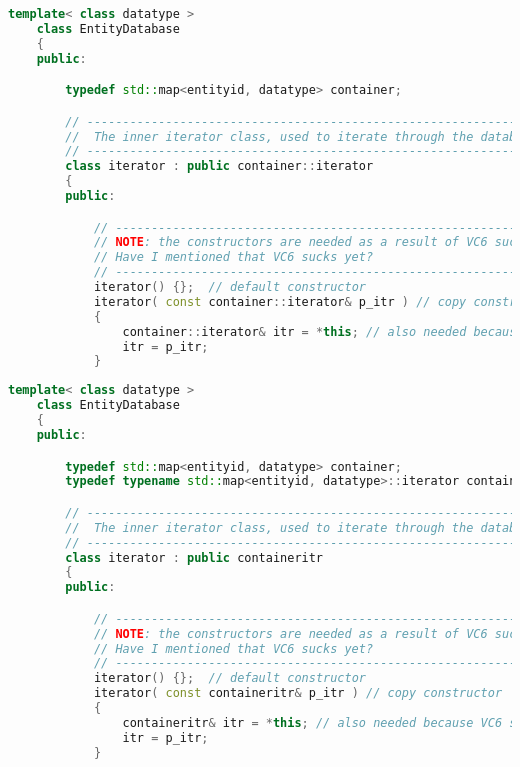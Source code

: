 \begin{lstlisting}[breaklines, label={lst:containeritrOri}, caption={Acesso ao iterador do tipo 'container' antes da correção}, language=C++]
    template< class datatype >
    class EntityDatabase
    {
    public:

        typedef std::map<entityid, datatype> container;

        // --------------------------------------------------------------------
        //  The inner iterator class, used to iterate through the database.
        // --------------------------------------------------------------------
        class iterator : public container::iterator
        {
        public:

            // --------------------------------------------------------------------
            // NOTE: the constructors are needed as a result of VC6 sucking.
            // Have I mentioned that VC6 sucks yet?
            // --------------------------------------------------------------------
            iterator() {};  // default constructor
            iterator( const container::iterator& p_itr ) // copy constructor
            {
                container::iterator& itr = *this; // also needed because VC6 sucks
                itr = p_itr;
            }
\end{lstlisting}

\begin{lstlisting}[breaklines, label={lst:containeritrFix}, caption={Correção do acesso ao iterador do tipo 'container'}, language=C++]
    template< class datatype >
    class EntityDatabase
    {
    public:

        typedef std::map<entityid, datatype> container;
        typedef typename std::map<entityid, datatype>::iterator containeritr;

        // --------------------------------------------------------------------
        //  The inner iterator class, used to iterate through the database.
        // --------------------------------------------------------------------
        class iterator : public containeritr
        {
        public:

            // --------------------------------------------------------------------
            // NOTE: the constructors are needed as a result of VC6 sucking.
            // Have I mentioned that VC6 sucks yet?
            // --------------------------------------------------------------------
            iterator() {};  // default constructor
            iterator( const containeritr& p_itr ) // copy constructor
            {
                containeritr& itr = *this; // also needed because VC6 sucks
                itr = p_itr;
            }
\end{lstlisting}

